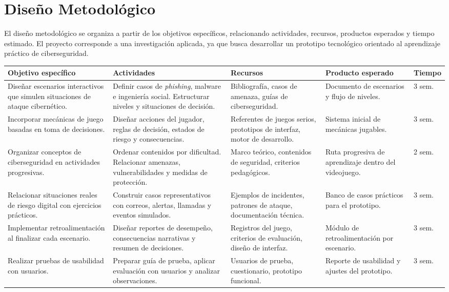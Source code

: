 \section{Diseño Metodológico}

El diseño metodológico se organiza a partir de los objetivos específicos, relacionando actividades, recursos, productos esperados y tiempo estimado. El proyecto corresponde a una investigación aplicada, ya que busca desarrollar un prototipo tecnológico orientado al aprendizaje práctico de ciberseguridad.

\begin{longtable}{|p{}|p{}|p{}|p{}|p{}|}
\hline
\textbf{Objetivo específico} & \textbf{Actividades} & \textbf{Recursos} & \textbf{Producto esperado} & \textbf{Tiempo} \\
\hline
Diseñar escenarios interactivos que simulen situaciones de ataque cibernético. &
Definir casos de \textit{phishing}, malware e ingeniería social. Estructurar niveles y situaciones de decisión. &
Bibliografía, casos de amenaza, guías de ciberseguridad. &
Documento de escenarios y flujo de niveles. &
3 sem. \\
\hline
Incorporar mecánicas de juego basadas en toma de decisiones. &
Diseñar acciones del jugador, reglas de decisión, estados de riesgo y consecuencias. &
Referentes de juegos serios, prototipos de interfaz, motor de desarrollo. &
Sistema inicial de mecánicas jugables. &
3 sem. \\
\hline
Organizar conceptos de ciberseguridad en actividades progresivas. &
Ordenar contenidos por dificultad. Relacionar amenazas, vulnerabilidades y medidas de protección. &
Marco teórico, contenidos de seguridad, criterios pedagógicos. &
Ruta progresiva de aprendizaje dentro del videojuego. &
2 sem. \\
\hline
Relacionar situaciones reales de riesgo digital con ejercicios prácticos. &
Construir casos representativos con correos, alertas, llamadas y eventos simulados. &
Ejemplos de incidentes, patrones de ataque, documentación técnica. &
Banco de casos prácticos para el prototipo. &
3 sem. \\
\hline
Implementar retroalimentación al finalizar cada escenario. &
Diseñar reportes de desempeño, consecuencias narrativas y resumen de decisiones. &
Registros del juego, criterios de evaluación, diseño de interfaz. &
Módulo de retroalimentación por escenario. &
3 sem. \\
\hline
Realizar pruebas de usabilidad con usuarios. &
Preparar guía de prueba, aplicar evaluación con usuarios y analizar observaciones. &
Usuarios de prueba, cuestionario, prototipo funcional. &
Reporte de usabilidad y ajustes del prototipo. &
3 sem. \\
\hline
\end{longtable}
